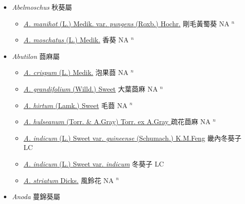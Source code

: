 
  \begin{itemize}
 \item[] \textit{Abelmoschus} 秋葵屬
                    
  \begin{itemize}
        \item[] \href{http://www.theplantlist.org/tpl1.1/search?q=Abelmoschus+manihot+var.+pungens}{\textit{A. manihot} (L.) Medik. var. \textit{pungens} (Roxb.) Hochr.}   剛毛黃蜀葵 NA $^n$
        \item[] \href{http://www.theplantlist.org/tpl1.1/search?q=Abelmoschus+moschatus}{\textit{A. moschatus} (L.) Medik.}   香葵 NA $^n$
  \end{itemize}
 \item[] \textit{Abutilon} 莔麻屬
                    
  \begin{itemize}
        \item[] \href{http://www.theplantlist.org/tpl1.1/search?q=Abutilon+crispum}{\textit{A. crispum} (L.) Medik.}   泡果莔 NA $^n$
        \item[] \href{http://www.theplantlist.org/tpl1.1/search?q=Abutilon+grandifolium}{\textit{A. grandifolium} (Willd.) Sweet}   大葉莔麻 NA $^n$
        \item[] \href{http://www.theplantlist.org/tpl1.1/search?q=Abutilon+hirtum}{\textit{A. hirtum} (Lamk.) Sweet}   毛莔 NA $^n$
        \item[] \href{http://www.theplantlist.org/tpl1.1/search?q=Abutilon+hulseanum}{\textit{A. hulseanum} (Torr. \& A.Gray) Torr. ex A.Gray }   疏花莔麻 NA $^n$
        \item[] \href{http://www.theplantlist.org/tpl1.1/search?q=Abutilon+indicum+var.+guineense}{\textit{A. indicum} (L.) Sweet var. \textit{guineense} (Schumach.) K.M.Feng}   畿內冬葵子 LC
        \item[] \href{http://www.theplantlist.org/tpl1.1/search?q=Abutilon+indicum+var.+indicum}{\textit{A. indicum} (L.) Sweet var. \textit{indicum}}   冬葵子 LC
        \item[] \href{http://www.theplantlist.org/tpl1.1/search?q=Abutilon+striatum}{\textit{A. striatum} Dicks.}   風鈴花 NA $^n$
  \end{itemize}
 \item[] \textit{Anoda} 蔓錦葵屬
                    

\end{itemize}
